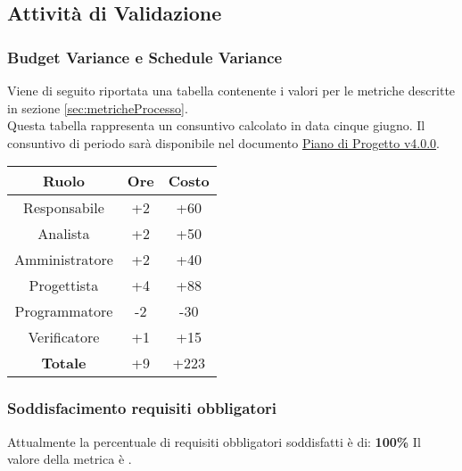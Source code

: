 \documentclass{scalatekids-article}
\begin{document}
\subsection{Attività di Validazione}

\subsubsection{Budget Variance e Schedule Variance}
Viene di seguito riportata una tabella contenente i valori per le metriche descritte in sezione \ref{sec:metricheProcesso}.\\ Questa tabella rappresenta un consuntivo calcolato in data cinque giugno. Il consuntivo di periodo sarà disponibile nel documento \href{run:./PianoDiProgetto\_v4.0.0.pdf}{Piano di Progetto v4.0.0}.
\begin{center}
  \normalsize
  \begin{tabular}{| c | c | c |}
    \hline
    \textbf{Ruolo} & \textbf{Ore} & \textbf{Costo}\\
    \hline
    Responsabile & +2 & +60\\ %
    Analista & +2 & +50 \\ %
    Amministratore & +2 & +40 \\ %
    Progettista & +4 & +88 \\ %
    Programmatore & -2 & -30 \\ %
    Verificatore & +1 & +15 \\ %
    \hline
    \textbf{Totale} & +9 & +223 \\
    \hline
  \end{tabular}
\end{center}

\subsubsection{Soddisfacimento requisiti obbligatori}
Attualmente la percentuale di requisiti obbligatori soddisfatti è di: \textbf{100\%}
Il valore della metrica è .

\end{document}
